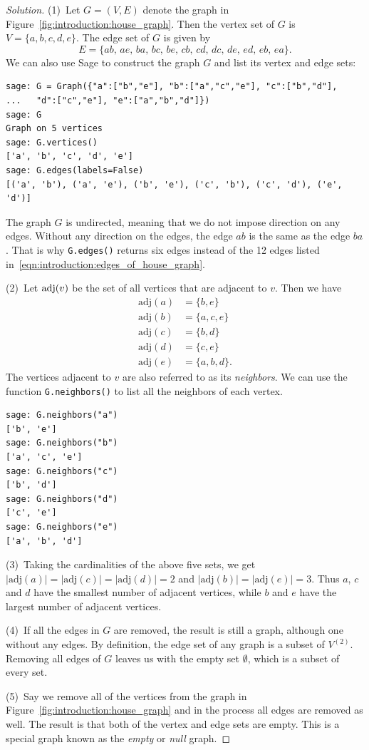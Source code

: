 \begin{proof}[Solution]
(1)~Let $G = (V, E)$ denote the graph in
Figure~\ref{fig:introduction:house_graph}. Then the vertex set of $G$
is $V = \{ a, b, c, d, e \}$. The edge set of $G$ is given by
\begin{equation}
\label{eqn:introduction:edges_of_house_graph}
E
=
\{ab,\, ae,\, ba,\, bc,\, be,\, cb,\, cd,\, dc,\, de,\, ed,\, eb,\, ea\}.
\end{equation}
We can also use Sage to construct the graph $G$ and list its vertex
and edge sets:
\begin{lstlisting}
sage: G = Graph({"a":["b","e"], "b":["a","c","e"], "c":["b","d"],
...   "d":["c","e"], "e":["a","b","d"]})
sage: G
Graph on 5 vertices
sage: G.vertices()
['a', 'b', 'c', 'd', 'e']
sage: G.edges(labels=False)
[('a', 'b'), ('a', 'e'), ('b', 'e'), ('c', 'b'), ('c', 'd'), ('e', 'd')]
\end{lstlisting}
The graph $G$ is undirected, meaning that we do not impose direction
on any edges. Without any direction on the edges, the edge $ab$ is the
same as the edge $ba$. That is why \texttt{G.edges()} returns six
edges instead of the 12 edges listed
in~\eqref{eqn:introduction:edges_of_house_graph}.

(2)~Let $\operatorname*{adj}(v)$\index{$\adj$} be the set of all vertices that are
adjacent to $v$. Then we have
\begin{align*}
\text{adj}(a) &= \{ b, e \} \\
\text{adj}(b) &= \{ a, c, e \} \\
\text{adj}(c) &= \{ b, d \} \\
\text{adj}(d) &= \{ c, e \} \\
\text{adj}(e) &= \{ a, b, d \}.
\end{align*}
The vertices adjacent to $v$ are also referred to as its
\emph{neighbors}. We can use the function \texttt{G.neighbors()} to
list all the neighbors of each vertex.
\begin{lstlisting}
sage: G.neighbors("a")
['b', 'e']
sage: G.neighbors("b")
['a', 'c', 'e']
sage: G.neighbors("c")
['b', 'd']
sage: G.neighbors("d")
['c', 'e']
sage: G.neighbors("e")
['a', 'b', 'd']
\end{lstlisting}

(3)~Taking the cardinalities of the above five sets, we get
$|\text{adj}(a)| = |\text{adj}(c)| = |\text{adj}(d)| = 2$ and
$|\text{adj}(b)| = |\text{adj}(e)| = 3$. Thus $a$, $c$ and $d$ have
the smallest number of adjacent vertices, while $b$ and $e$ have the
largest number of adjacent vertices.

(4)~If all the edges in $G$ are removed, the result is still a graph,
although one without any edges. By definition, the edge set of any
graph is a subset of $V^{(2)}$. Removing all edges of $G$ leaves us
with the empty set $\emptyset$, which is a subset of every set.

(5)~Say we remove all of the vertices from the graph in
Figure~\ref{fig:introduction:house_graph} and in the process all edges
are removed as well. The result is that both of the vertex and edge
sets are empty. This is a special graph known as the \emph{empty} or
\emph{null} graph.
\end{proof}

